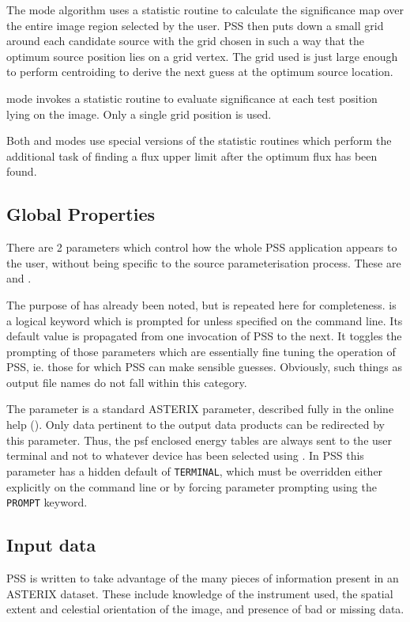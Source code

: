 The  mode algorithm uses a statistic routine to calculate
the significance map over the entire image region selected by the user.
PSS then puts down a small grid around each candidate source with the
grid chosen in such a way that the optimum source position lies on a
grid vertex. The grid used is just large enough to perform centroiding
to derive the next guess at the optimum source location. 

 mode invokes a statistic routine to evaluate significance
at each test position lying on the image. Only a single grid position
is used. 

Both  and  modes use special versions of the
statistic routines which perform the additional task of finding a flux
upper limit after the optimum flux has been found.

\subsection{Global Properties}
There are 2 parameters which control how the whole PSS application
appears to the user, without being specific to the source parameterisation
process. These are  and .

The purpose of  has already been noted, but is repeated
here for completeness.  is a logical keyword which is prompted for 
unless specified on the command line. Its default value is propagated from one
invocation of PSS to the next. It toggles the prompting of those parameters
which are essentially fine tuning the operation of PSS, ie. those for which
PSS can make sensible guesses. Obviously, such things as output file names
do not fall within this category.

The  parameter is a standard ASTERIX parameter, described fully
in the online help (). Only data 
pertinent to the output data products can be redirected by this parameter.
Thus, the psf enclosed energy tables are always sent to the user terminal
and not to whatever device has been selected using . In PSS this
parameter has a hidden default of \verb+TERMINAL+, which must be overridden
either explicitly on the command line or by forcing parameter prompting using
the \verb+PROMPT+ keyword.

\subsection{Input data}
\label{pss:ref:inp}
PSS is written to take advantage of the many pieces of information present in
an ASTERIX dataset. These include knowledge of the instrument used, the
spatial extent and celestial orientation of the image, and presence of bad
or missing data. 

